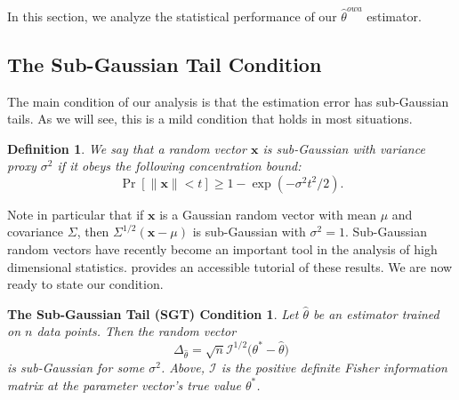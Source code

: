 \documentclass[twoside]{article}
\newtheorem{defn}{Definition}
\newcommand{\E}{\mathbb{E}}
\newcommand{\x}{\mathbf{x}}
\newcommand{\w}{\theta}
\newcommand{\wowa}{\hat\w^{owa}}
\newcommand{\wave}{\hat\w^{ave}}
\newcommand{\wstar}{{\w^{*}}}
\newcommand{\what}{{\hat\w}}
\newcommand{\I}{\mathcal I}
\newcommand{\trans}[1]{\ensuremath{{#1}^{\mathsf{T}}}}
\newcommand{\ltwo}[1]{{\lVert {#1} \rVert}}
\newcommand{\prob}[1]{\Pr\left[{#1}\right]}
\begin{document}
In this section, we analyze the statistical performance of our $\wowa$ estimator.


\subsection{The Sub-Gaussian Tail Condition}

The main condition of our analysis is that the estimation error has sub-Gaussian tails.
As we will see, this is a mild condition that holds in most situations.

\begin{defn}
We say that a random vector $\x$ is \emph{sub-Gaussian} with variance proxy $\sigma^2$ if it obeys the following concentration bound:
\begin{equation}
\prob{\ltwo{\x} < t} \ge 1 - \exp(-\sigma^2t^2/2)
.
\end{equation}
\end{defn}

Note in particular that if $\x$ is a Gaussian random vector with mean $\mu$ and covariance $\Sigma$,
then $\Sigma^{1/2}(\x-\mu)$ is sub-Gaussian with $\sigma^2=1$.
Sub-Gaussian random vectors have recently become an important tool in the analysis of high dimensional statistics.
\citet{vershynin2010introduction} provides an accessible tutorial of these results.
We are now ready to state our condition.

\newtheorem*{sgtc}{The Sub-Gaussian Tail (SGT) Condition}
\begin{sgtc}
Let $\what$ be an estimator trained on $n$ data points.
Then the random vector
\begin{equation}
\Delta_\what = \sqrt{n}{\I^{1/2}\big(\wstar-\what\big)}
\end{equation}
is sub-Gaussian for some $\sigma^2$.
Above, $\I$ is the positive definite Fisher information matrix at the parameter vector's true value $\wstar$.
\end{sgtc}

\end{document}
